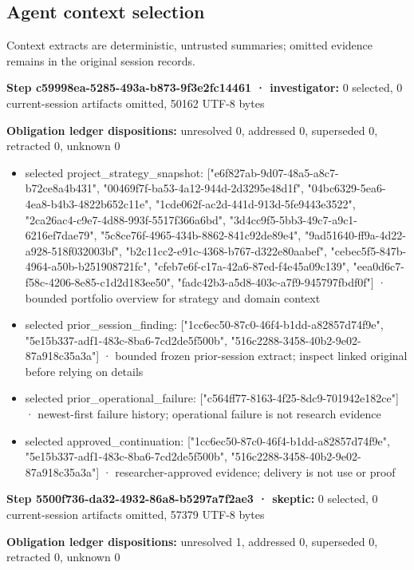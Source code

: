 \documentclass[11pt]{article}
\begin{document}
\subsection{Agent context selection}
Context extracts are deterministic, untrusted summaries; omitted evidence remains in the original session records.\par
\textbf{Step c59998ea-5285-493a-b873-9f3e2fc14461 · investigator:} 0 selected, 0 current-session artifacts omitted, 50162 UTF-8 bytes\par
\textbf{Obligation ledger dispositions:} unresolved 0, addressed 0, superseded 0, retracted 0, unknown 0\par
\begin{itemize}
\item selected project\_strategy\_snapshot: ["e6f827ab-9d07-48a5-a8c7-b72ce8a4b431", "00469f7f-ba53-4a12-944d-2d3295e48d1f", "04bc6329-5ea6-4ea8-b4b3-4822b652c11e", "1cde062f-ac2d-441d-913d-5fe9443e3522", "2ca26ac4-c9e7-4d88-993f-5517f366a6bd", "3d4cc9f5-5bb3-49c7-a9c1-6216ef7dae79", "5c8ce76f-4965-434b-8862-841c92de89e4", "9ad51640-ff9a-4d22-a928-518f032003bf", "b2c11cc2-e91c-4368-b767-d322e80aabef", "cebec5f5-847b-4964-a50b-b251908721fc", "cfeb7e6f-c17a-42a6-87ed-f4e45a09c139", "eea0d6c7-f58c-4206-8e85-c1d2d183ee50", "fadc42b3-a5d8-403c-a7f9-945797fbdf0f"] · bounded portfolio overview for strategy and domain context
\item selected prior\_session\_finding: ["1cc6ec50-87c0-46f4-b1dd-a82857d74f9e", "5e15b337-adf1-483c-8ba6-7cd2de5f500b", "516c2288-3458-40b2-9e02-87a918c35a3a"] · bounded frozen prior-session extract; inspect linked original before relying on details
\item selected prior\_operational\_failure: ["c564ff77-8163-4f25-8dc9-701942e182ce"] · newest-first failure history; operational failure is not research evidence
\item selected approved\_continuation: ["1cc6ec50-87c0-46f4-b1dd-a82857d74f9e", "5e15b337-adf1-483c-8ba6-7cd2de5f500b", "516c2288-3458-40b2-9e02-87a918c35a3a"] · researcher-approved evidence; delivery is not use or proof
\end{itemize}
\textbf{Step 5500f736-da32-4932-86a8-b5297a7f2ae3 · skeptic:} 0 selected, 0 current-session artifacts omitted, 57379 UTF-8 bytes\par
\textbf{Obligation ledger dispositions:} unresolved 1, addressed 0, superseded 0, retracted 0, unknown 0\par
\end{document}
